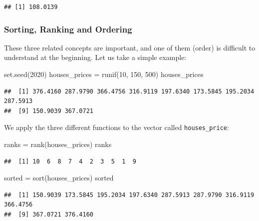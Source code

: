 \documentclass[
]{book}
\newenvironment{Shaded}{\begin{snugshade}}{\end{snugshade}}
\newcommand{\DecValTok}[1]{\textcolor[rgb]{0.00,0.00,0.81}{#1}}
\newcommand{\FunctionTok}[1]{\textcolor[rgb]{0.00,0.00,0.00}{#1}}
\newcommand{\NormalTok}[1]{#1}
\newcommand{\OtherTok}[1]{\textcolor[rgb]{0.56,0.35,0.01}{#1}}
\theoremstyle{definition}
\theoremstyle{definition}
\theoremstyle{definition}
\theoremstyle{definition}
\theoremstyle{remark}
\begin{document}
\begin{verbatim}
## [1] 108.0139
\end{verbatim}

\hypertarget{sorting-ranking-and-ordering}{%
\subsubsection{Sorting, Ranking and Ordering}\label{sorting-ranking-and-ordering}}

These three related concepts are important, and one of them (order) is difficult to understand at the beginning. Let us take a simple example:

\begin{Shaded}
\begin{Highlighting}[]
\FunctionTok{set.seed}\NormalTok{(}\DecValTok{2020}\NormalTok{)}
\NormalTok{houses\_prices }\OtherTok{=} \FunctionTok{runif}\NormalTok{(}\DecValTok{10}\NormalTok{, }\DecValTok{150}\NormalTok{, }\DecValTok{500}\NormalTok{)}
\NormalTok{houses\_prices}
\end{Highlighting}
\end{Shaded}

\begin{verbatim}
##  [1] 376.4160 287.9790 366.4756 316.9119 197.6340 173.5845 195.2034 287.5913
##  [9] 150.9039 367.0721
\end{verbatim}

We apply the three different functions to the vector called \texttt{houses\_price}:

\begin{Shaded}
\begin{Highlighting}[]
\NormalTok{ranks }\OtherTok{=} \FunctionTok{rank}\NormalTok{(houses\_prices)}
\NormalTok{ranks}
\end{Highlighting}
\end{Shaded}

\begin{verbatim}
##  [1] 10  6  8  7  4  2  3  5  1  9
\end{verbatim}

\begin{Shaded}
\begin{Highlighting}[]
\NormalTok{sorted }\OtherTok{=} \FunctionTok{sort}\NormalTok{(houses\_prices)}
\NormalTok{sorted}
\end{Highlighting}
\end{Shaded}

\begin{verbatim}
##  [1] 150.9039 173.5845 195.2034 197.6340 287.5913 287.9790 316.9119 366.4756
##  [9] 367.0721 376.4160
\end{verbatim}
\end{document}
